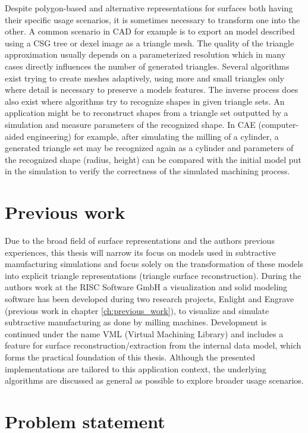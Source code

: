 Despite polygon-based and alternative representations for surfaces both having their specific usage scenarios, it is sometimes necessary to transform one into the other.
A common scenario in CAD for example is to export an model described using a CSG tree or dexel image as a triangle mesh.
The quality of the triangle approximation usually depends on a parameterized resolution which in many cases directly influences the number of generated triangles.
Several algorithms exist trying to create meshes adaptively, using more and small triangles only where detail is necessary to preserve a models features.
%
The inverse process does also exist where algorithms try to recognize shapes in given triangle sets.
An application might be to reconstruct shapes from a triangle set outputted by a simulation and measure parameters of the recognized shape.
In CAE (computer-aided engineering) for example, after simulating the milling of a cylinder, a generated triangle set may be recognized again as a cylinder and parameters of the recognized shape (\eg radius, height) can be compared with the initial model put in the simulation to verify the correctness of the simulated machining process.


\section{Previous work}

Due to the broad field of surface representations and the authors previous experiences, this thesis will narrow its focus on models used in subtractive manufacturing simulations and focus solely on the transformation of these models into explicit triangle representations (triangle surface reconstruction).
During the authors work at the RISC Software GmbH a visualization and solid modeling software has been developed during two research projects, Enlight and Engrave (\cf previous work in chapter \ref{ch:previous_work}), to visualize and simulate subtractive manufacturing as done by milling machines.
Development is continued under the name VML (Virtual Machining Library) and includes a feature for surface reconstruction/extraction from the internal data model, which forms the practical foundation of this thesis.
Although the presented implementations are tailored to this application context, the underlying algorithms are discussed as general as possible to explore broader usage scenarios.


\section{Problem statement}
\label{sec:problem}

